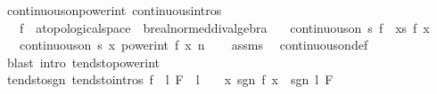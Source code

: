 \begin{isabellebody}
\endisatagproof
{\isafoldproof}%
%
\isadelimproof
\isanewline
%
\endisadelimproof
\isanewline
{}\isamarkupfalse%
\ continuous{\isacharunderscore}{\kern0pt}on{\isacharunderscore}{\kern0pt}power{\isacharunderscore}{\kern0pt}int\ {\isacharbrackleft}{\kern0pt}continuous{\isacharunderscore}{\kern0pt}intros{\isacharbrackright}{\kern0pt}{\isacharcolon}{\kern0pt}\isanewline
\ \ \ f\ {\isacharcolon}{\kern0pt}{\isacharcolon}{\kern0pt}\ {\isachardoublequoteopen}{\isacharprime}{\kern0pt}a{\isacharcolon}{\kern0pt}{\isacharcolon}{\kern0pt}topological{\isacharunderscore}{\kern0pt}space\ {\isasymRightarrow}\ {\isacharprime}{\kern0pt}b{\isacharcolon}{\kern0pt}{\isacharcolon}{\kern0pt}real{\isacharunderscore}{\kern0pt}normed{\isacharunderscore}{\kern0pt}div{\isacharunderscore}{\kern0pt}algebra{\isachardoublequoteclose}\isanewline
\ \ \ {\isachardoublequoteopen}continuous{\isacharunderscore}{\kern0pt}on\ s\ f{\isachardoublequoteclose}\ \ {\isachardoublequoteopen}{\isasymforall}x{\isasymin}s{\isachardot}{\kern0pt}\ f\ x\ {\isasymnoteq}\ {}{\isachardoublequoteclose}\isanewline
\ \ \ {\isachardoublequoteopen}continuous{\isacharunderscore}{\kern0pt}on\ s\ {\isacharparenleft}{\kern0pt}{\isasymlambda}x{\isachardot}{\kern0pt}\ power{\isacharunderscore}{\kern0pt}int\ {\isacharparenleft}{\kern0pt}f\ x{\isacharparenright}{\kern0pt}\ n{\isacharparenright}{\kern0pt}{\isachardoublequoteclose}\isanewline
%
\isadelimproof
\ \ %
\endisadelimproof
%
\isatagproof
{}\isamarkupfalse%
\ assms\ \isamarkupfalse%
\ continuous{\isacharunderscore}{\kern0pt}on{\isacharunderscore}{\kern0pt}def\ \isamarkupfalse%
\ {\isacharparenleft}{\kern0pt}blast\ intro{\isacharcolon}{\kern0pt}\ tendsto{\isacharunderscore}{\kern0pt}power{\isacharunderscore}{\kern0pt}int{\isacharparenright}{\kern0pt}%
\endisatagproof
{\isafoldproof}%
%
\isadelimproof
\isanewline
%
\endisadelimproof
\isanewline
{}\isamarkupfalse%
\ tendsto{\isacharunderscore}{\kern0pt}sgn\ {\isacharbrackleft}{\kern0pt}tendsto{\isacharunderscore}{\kern0pt}intros{\isacharbrackright}{\kern0pt}{\isacharcolon}{\kern0pt}\ {\isachardoublequoteopen}{\isacharparenleft}{\kern0pt}f\ {\isasymlonglongrightarrow}\ l{\isacharparenright}{\kern0pt}\ F\ {\isasymLongrightarrow}\ l\ {\isasymnoteq}\ {}\ {\isasymLongrightarrow}\ {\isacharparenleft}{\kern0pt}{\isacharparenleft}{\kern0pt}{\isasymlambda}x{\isachardot}{\kern0pt}\ sgn\ {\isacharparenleft}{\kern0pt}f\ x{\isacharparenright}{\kern0pt}{\isacharparenright}{\kern0pt}\ {\isasymlonglongrightarrow}\ sgn\ l{\isacharparenright}{\kern0pt}\ F{\isachardoublequoteclose}\isanewline

\end{isabellebody}
